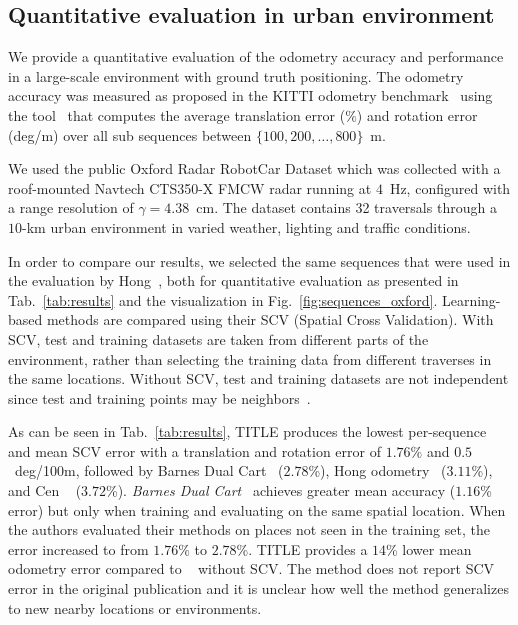 \subsection{Quantitative evaluation in urban environment}
\label{sec:quantitative_eval_sec}
We provide a quantitative evaluation of the odometry accuracy and performance in a large-scale environment with ground truth positioning. The odometry accuracy was measured as proposed in the KITTI odometry benchmark~\cite{Geiger2012CVPR} using the tool~\cite{zhan2019dfvo} that computes the average translation error ($\%$) and rotation error (deg/m) over all sub sequences between $\{100,200, \ldots, 800\}$~m.

We used the public Oxford Radar RobotCar Dataset which was collected with a roof-mounted Navtech CTS350-X \ac{FMCW} radar running at $4$~Hz, configured with a range resolution of $\gamma=4.38$~cm. The dataset contains 32 traversals through a $10$-km urban environment in varied weather, lighting and traffic conditions.

In order to compare our results, we selected the same sequences that were used in the evaluation by Hong~\cite{hong2020radarslam}, both for quantitative evaluation as presented in Tab.~\ref{tab:results} and the visualization in Fig.~\ref{fig:sequences_oxford}. Learning-based methods are compared using their SCV (Spatial Cross Validation). With SCV, test and training datasets are taken from different parts of the environment, rather than selecting the training data from different traverses in the same locations. Without SCV, test and training datasets are not independent since test and training points may be neighbors~\cite{lovelace_geocomputation_2019}.



As can be seen in Tab.~\ref{tab:results}, \ac{TITLE} produces the lowest per-sequence and mean SCV error with a translation and rotation error of $1.76\%$ and $0.5$~deg/100m, followed by Barnes Dual Cart~\cite{barnes_masking_2020} ($2.78$\%), Hong odometry~\cite{hong2020radarslam} ($3.11$\%), and Cen ~\cite{8460687} ($3.72$\%).
\textit{Barnes Dual Cart}~\cite{barnes_masking_2020} achieves greater mean accuracy ($1.16$\% error) but only when training and evaluating on the same spatial location. When the authors evaluated their methods on places not seen in the training set, the error increased to from $1.76\%$ to $2.78$\%.
\ac{TITLE} provides a $14$\% lower mean odometry error compared to ~\cite{barnes_under_2020} without SCV. The method does not report SCV error in the original publication and it is unclear how well the method generalizes to new nearby locations or environments. 

